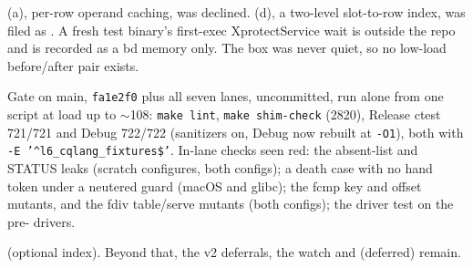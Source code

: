 (a), per-row operand caching, was declined. (d), a
two-level slot-to-row index, was filed as . A fresh test binary's
first-exec XprotectService wait is outside the repo and is recorded as a bd
memory only. The box was never quiet, so no low-load before/after pair exists.

Gate on main, \texttt{fa1e2f0} plus all seven lanes, uncommitted, run alone
from one script at load up to $\sim$108: \texttt{make lint}, \texttt{make
shim-check} (2820), Release ctest 721/721 and Debug 722/722 (sanitizers on,
Debug now rebuilt at \texttt{-O1}), both with
\texttt{-E '\^{}l6\_cqlang\_fixtures\$'}. In-lane checks seen red: the
absent-list and STATUS leaks (scratch configures, both configs); a death case
with no hand token under a neutered guard (macOS and glibc); the fcmp key and
offset mutants, and the fdiv table/serve mutants (both configs); the driver
test on the pre- drivers.

 (optional index). Beyond that, the v2 deferrals, the 
watch and  (deferred) remain.
